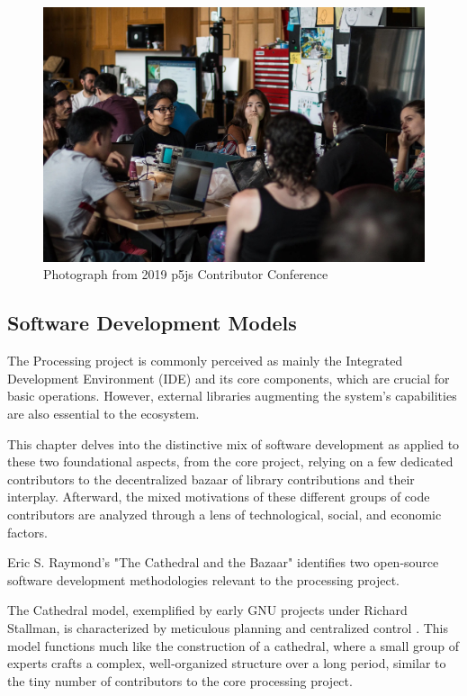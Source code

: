 
\begin{figure}
	\centering
	\includegraphics[width=\textwidth]{images/cathedral-or-bazaar.jpeg}
	\caption{Photograph from 2019 p5js Contributor Conference}
	\label{fig:p5ps-conference}
\end{figure}


\subsection{Software Development Models}

The Processing project is commonly perceived as mainly the Integrated Development Environment (IDE) and its core components, which are crucial for basic operations. However, external libraries augmenting the system's capabilities are also essential to the ecosystem. 

This chapter delves into the distinctive mix of software development as applied to these two foundational aspects, from the core project, relying on a few dedicated contributors to the decentralized bazaar of library contributions and their interplay. Afterward, the mixed motivations of these different groups of code contributors are analyzed through a lens of technological, social, and economic factors. 

Eric S. Raymond's "The Cathedral and the Bazaar" \parencite{CathedralBazaarMusings2002a} identifies two open-source software development methodologies relevant to the processing project. 

The Cathedral model, exemplified by early GNU projects under Richard Stallman, is characterized by meticulous planning and centralized control \parencite{stallmanFreeSoftwareFree2002}. This model functions much like the construction of a cathedral, where a small group of experts crafts a complex, well‐organized structure over a long period, similar to the tiny number of contributors to the core processing project. 

